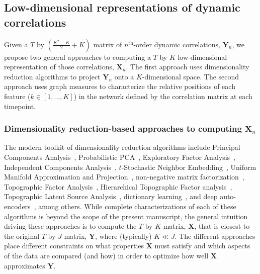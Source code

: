 \documentclass[english]{article}
\begin{document}
\subsection*{Low-dimensional representations of dynamic
  correlations}

Given a $T$ by $\left( \frac{K^2 - K}{2} + K \right)$ matrix of
$n^\mathrm{th}$-order dynamic correlations, $\mathbf{Y}_n$, we propose
two general approaches to computing a $T$ by $K$ low-dimensional
representation of those correlations, $\mathbf{X}_n$.  The first
approach uses dimensionality reduction algorithms to project
$\mathbf{Y}_n$ onto a $K$-dimensional space.  The second approach uses
graph measures to characterize the relative positions of each feature
($k \in \left[1, ..., K \right]$) in the network defined by the
correlation matrix at each timepoint.

\subsubsection*{Dimensionality reduction-based approaches to computing
  $\mathbf{X}_n$}

The modern toolkit of dimensionality reduction algorithms include
Principal Components Analysis~\citep[PCA;][]{Pear01}, Probabilistic
PCA~\citep[PPCA;][]{TippBish99}, Exploratory Factor
Analysis~\citep[EFA;][]{Spea04}, Independent Components
Analysis~\citep[ICA;][]{JuttHera91, ComoEtal91}, $t$-Stochastic
Neighbor Embedding~\citep[$t$-SNE;][]{vandHint08}, Uniform Manifold
Approximation and Projection~\citep[UMAP;][]{McInEtal18}, non-negative
matrix factorization~\citep[NMF;][]{LeeSeun99}, Topographic Factor
Analysis~\cite[TFA;][]{MannEtal14b}, Hierarchical Topographic Factor
analysis~\cite[HTFA;][]{MannEtal18}, Topographic Latent Source
Analysis~\cite[TLSA;][]{GersEtal11}, dictionary
learning~\citep{MairEtal09a, MairEtal09b}, and deep
auto-encoders~\citep{HintSala06}, among others.  While complete
characterizations of each of these algorithms is beyond the scope of
the present manuscript, the general intuition driving these approaches
is to compute the $T$ by $K$ matrix, $\mathbf{X}$, that is closest to
the original $T$ by $J$ matrix, $\mathbf{Y}$, where (typically)
$K \ll J$.  The different approaches place different constraints on
what properties $\mathbf{X}$ must satisfy and which aspects of the
data are compared (and how) in order to optimize how well
$\mathbf{X}$ approximates $\mathbf{Y}$.
\end{document}

